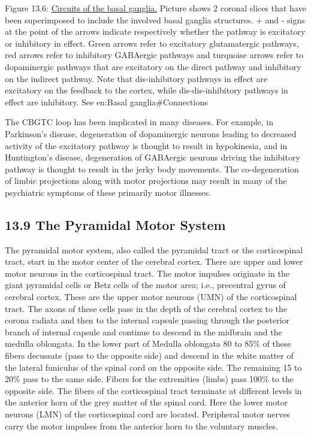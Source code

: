 Figure 13.6:
\href{https://commons.wikimedia.org/wiki/File:Basal_ganglia_circuits.svg}{Circuits
of the basal ganglia.} Picture shows 2 coronal slices that have been
superimposed to include the involved basal ganglia structures. + and -
signs at the point of the arrows indicate respectively whether the
pathway is excitatory or inhibitory in effect. Green arrows refer to
excitatory glutamatergic pathways, red arrows refer to inhibitory
GABAergic pathways and turquoise arrows refer to dopaminergic pathways
that are excitatory on the direct pathway and inhibitory on the indirect
pathway. Note that dis-inhibitory pathways in effect are excitatory on
the feedback to the cortex, while dis-dis-inhibitory pathways in effect
are inhibitory. See en:Basal ganglia\#Connections

The CBGTC loop has been implicated in many diseases. For example, in
Parkinson's disease, degeneration of dopaminergic neurons leading to
decreased activity of the excitatory pathway is thought to result in
hypokinesia, and in Huntington's disease, degeneration of GABAergic
neurons driving the inhibitory pathway is thought to result in the jerky
body movements. The co-degeneration of limbic projections along with
motor projections may result in many of the psychiatric symptoms of
these primarily motor illnesses.

\hypertarget{the-pyramidal-motor-system}{%
\subsection{\texorpdfstring{{13.9} The Pyramidal Motor
System}{13.9 The Pyramidal Motor System}}\label{the-pyramidal-motor-system}}

The pyramidal motor system, also called the pyramidal tract or the
corticospinal tract, start in the motor center of the cerebral cortex.
There are upper and lower motor neurons in the corticospinal tract. The
motor impulses originate in the giant pyramidal cells or Betz cells of
the motor area; i.e., precentral gyrus of cerebral cortex. These are the
upper motor neurons (UMN) of the corticospinal tract. The axons of these
cells pass in the depth of the cerebral cortex to the corona radiata and
then to the internal capsule passing through the posterior branch of
internal capsule and continue to descend in the midbrain and the medulla
oblongata. In the lower part of Medulla oblongata 80 to 85\% of these
fibers decussate (pass to the opposite side) and descend in the white
matter of the lateral funiculus of the spinal cord on the opposite side.
The remaining 15 to 20\% pass to the same side. Fibers for the
extremities (limbs) pass 100\% to the opposite side. The fibers of the
corticospinal tract terminate at different levels in the anterior horn
of the grey matter of the spinal cord. Here the lower motor neurons
(LMN) of the corticospinal cord are located. Peripheral motor nerves
carry the motor impulses from the anterior horn to the voluntary
muscles.

